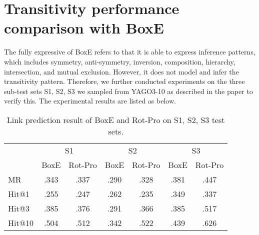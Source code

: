 \documentclass{article}
\begin{document}
\section{Transitivity performance comparison with BoxE }
 The fully expressive of BoxE refers to that it is able to express inference patterns, which includes symmetry, anti-symmetry, inversion, composition, hierarchy, intersection, and mutual exclusion. However, it does not model and infer the transitivity pattern. Therefore, we further conducted experiments on the three sub-test sets S1, S2, S3 we sampled from YAGO3-10 as described in the paper to verify this. The experimental results are listed as below.
\begin{table}[H]
\caption{Link prediction result of BoxE and Rot-Pro on S1, S2, S3 test sets.}
    \label{tab:my_label}
    \centering

    \begin{tabular}{lcccccc}
    \toprule
    &
    \multicolumn{2}{c}{S1} &
    \multicolumn{2}{c}{S2} &
    \multicolumn{2}{c}{S3}
    \\
      \cmidrule(lr{.75em}){2-3}
     \cmidrule(lr{.75em}){4-5}
      \cmidrule(lr{.75em}){6-7}
    &BoxE & Rot-Pro
    &BoxE & Rot-Pro
    &BoxE & Rot-Pro\\
    \midrule
        MR & .343 &.337& .290 & .328 & .381 & .447 \\
        Hit@1 & .255 & .247& .262 & .235& .349 & .337\\
        Hit@3 & .385 &.376 & .291 & .366 &.385 & .517 \\
        Hit@10 & .504  & .512 &  .342 & .522& .439 & .626\\
        \bottomrule
    \end{tabular}

\end{table}
\end{document}
